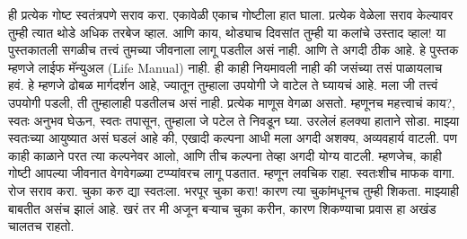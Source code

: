 ही प्रत्येक गोष्ट स्वतंत्रपणे सराव करा. एकावेळी एकाच गोष्टीला हात घाला. प्रत्येक वेळेला सराव केल्यावर तुम्ही त्यात थोडे अधिक तरबेज व्हाल. आणि काय, थोड्याच दिवसांत तुम्ही या कलांचे उस्ताद व्हाल!
या पुस्तकातली सगळीच तत्त्वं तुमच्या जीवनाला लागू पडतील असं नाही. आणि ते अगदी ठीक आहे. हे पुस्तक म्हणजे लाईफ मॅन्युअल (Life Manual) नाही. ही काही नियमावली नाही की जसंच्या तसं पाळायलाच हवं. हे म्हणजे ढोबळ मार्गदर्शन आहे, ज्यातून तुम्हाला उपयोगी जे वाटेल ते घ्यायचं आहे. मला जी तत्त्वं उपयोगी पडली, ती तुम्हालाही पडतीलच असं नाही. प्रत्येक माणूस वेगळा असतो. म्हणूनच महत्त्वाचं काय?,  स्वतः अनुभव घेऊन, स्वतः तपासून, तुम्हाला जे पटेल ते निवडून घ्या. उरलेलं हलक्या हाताने सोडा.
माझ्या स्वतःच्या आयुष्यात असं घडलं आहे की, एखादी कल्पना आधी मला अगदी अशक्य, अव्यवहार्य वाटली. पण काही काळाने परत त्या कल्पनेवर आलो, आणि तीच कल्पना तेव्हा अगदी योग्य वाटली. म्हणजेच, काही गोष्टी आपल्या जीवनात वेगवेगळ्या टप्प्यांवरच लागू पडतात.
म्हणून लवचिक राहा. स्वतःशीच माफक वागा. रोज सराव करा. चुका करु द्या स्वतःला. भरपूर चुका करा! कारण त्या चुकांमधूनच तुम्ही शिकता. माझ्याही बाबतीत असंच झालं आहे. खरं तर मी अजून बऱ्याच चुका करीन, कारण शिकण्याचा प्रवास हा अखंड चालतच राहतो.
